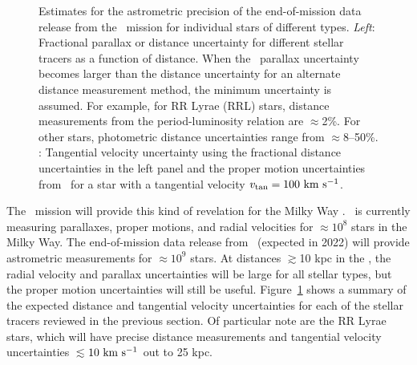 \begin{figure}[h]
\centering
\caption{Estimates for the astrometric precision of the end-of-mission data
release from the \gaia\ mission for individual stars of different types.
\textit{Left}: Fractional parallax or distance uncertainty for different stellar
tracers as a function of distance. When the \gaia\ parallax uncertainty becomes
larger than the distance uncertainty for an alternate distance measurement
method, the minimum uncertainty is assumed. For example, for RR Lyrae (RRL)
stars, distance measurements from the period-luminosity relation are
$\approx$2\%. For other stars, photometric distance uncertainties range from
$\approx$8--50\%. : Tangential velocity uncertainty using the
fractional distance uncertainties in the left panel and the proper motion
uncertainties from \gaia\ for a star with a tangential velocity $v_{\rm tan} =
100~\mathrm{km}~\mathrm{s}^{-1}$.}
\label{fig:gaiastellarpops}
\end{figure}

The \gaia\ mission will provide this kind of revelation for the Milky Way
\mwhalo. \gaia\ is currently measuring parallaxes, proper motions, and radial
velocities for $\approx$$10^{8}$ stars in the Milky Way. The end-of-mission data
release from \gaia\ (expected in 2022) will provide astrometric measurements for
$\approx$$10^{9}$ stars. At distances $\gtrsim$10 kpc in the \mwhalo, the radial
velocity and parallax uncertainties will be large for all stellar types, but the
proper motion uncertainties will still be useful.
Figure~\ref{fig:gaiastellarpops} shows a summary of the expected distance and
tangential velocity uncertainties for each of the stellar tracers reviewed in
the previous section. Of particular note are the RR Lyrae stars, which will have
precise distance measurements and tangential velocity uncertainties
$\lesssim$$10~\mathrm{km}~\mathrm{s}^{-1}$ out to 25 kpc.

